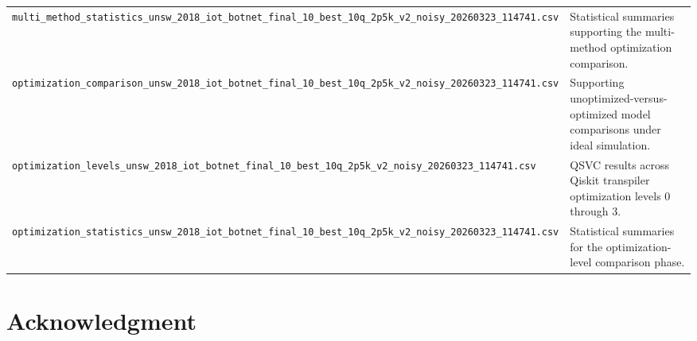 \documentclass{ieeeaccess}
\begin{document}
\begin{table}[t]
{\begin{tabular}{|l|p{}|}
\texttt{multi\_method\_statistics\_unsw\_2018\_iot\_botnet\_final\_10\_best\_10q\_2p5k\_v2\_noisy\_20260323\_114741.csv} & Statistical summaries supporting the multi-method optimization comparison. \\
\texttt{optimization\_comparison\_unsw\_2018\_iot\_botnet\_final\_10\_best\_10q\_2p5k\_v2\_noisy\_20260323\_114741.csv} & Supporting unoptimized-versus-optimized model comparisons under ideal simulation. \\
\texttt{optimization\_levels\_unsw\_2018\_iot\_botnet\_final\_10\_best\_10q\_2p5k\_v2\_noisy\_20260323\_114741.csv} & QSVC results across Qiskit transpiler optimization levels 0 through 3. \\
\texttt{optimization\_statistics\_unsw\_2018\_iot\_botnet\_final\_10\_best\_10q\_2p5k\_v2\_noisy\_20260323\_114741.csv} & Statistical summaries for the optimization-level comparison phase. \\
\hline
\end{tabular}%
}
\end{table}

\section*{Acknowledgment}
\end{document}
